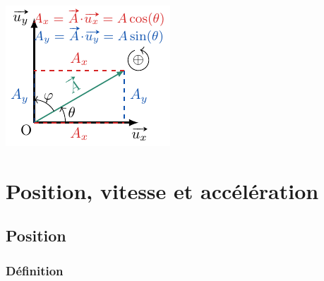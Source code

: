 \documentclass[../../main/main.tex]{subfiles}
\begin{document}
\begin{tcb*}[sidebyside, righthand ratio=.3]
\begin{center}
{			\includegraphics[width=\linewidth]{proj_prof}
		}
		\vspace{-15pt}
	\end{center}
\end{tcb*}

\section{Position, vitesse et accélération}
\subsection{Position}
\subsubsection{Définition}
\end{document}
